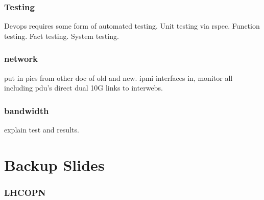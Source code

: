 \documentclass{beamer}
\begin{document}
\begin{frame}
  \frametitle{Testing}
  Devops requires some form of automated testing.
  Unit testing via rspec.
  Function testing.
  Fact testing.
  System testing.
\end{frame}


\begin{frame}
  \frametitle{network}
  put in pics from other doc of old and new.
  ipmi interfaces in, monitor all including pdu's
  direct dual 10G links to interwebs.
\end{frame}

\begin{frame}
  \frametitle{bandwidth}
  explain test and results.
\end{frame}



\section{Backup Slides}

\begin{frame}
  \frametitle{LHCOPN}
\end{frame}
\end{document}
